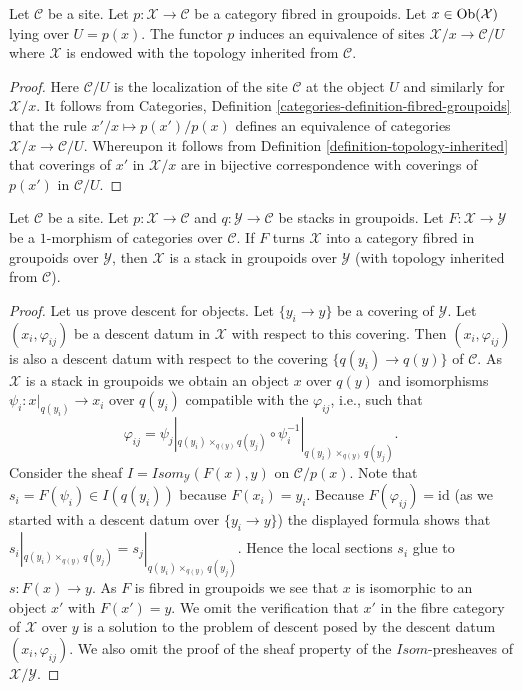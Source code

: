 \begin{lemma}
\label{lemma-localizing}
Let $\mathcal{C}$ be a site. Let $p : \mathcal{X} \to \mathcal{C}$
be a category fibred in groupoids. Let $x \in \mathop{\mathrm{Ob}}\nolimits(\mathcal{X})$
lying over $U = p(x)$. The functor $p$ induces an equivalence of sites
$\mathcal{X}/x \to \mathcal{C}/U$ where $\mathcal{X}$ is endowed with
the topology inherited from $\mathcal{C}$.
\end{lemma}

\begin{proof}
Here $\mathcal{C}/U$ is the localization of the site
$\mathcal{C}$ at the object $U$ and similarly for $\mathcal{X}/x$.
It follows from
Categories, Definition \ref{categories-definition-fibred-groupoids}
that the rule $x'/x \mapsto p(x')/p(x)$ defines an equivalence of
categories $\mathcal{X}/x \to \mathcal{C}/U$. Whereupon it follows from
Definition \ref{definition-topology-inherited}
that coverings of $x'$ in $\mathcal{X}/x$ are in bijective correspondence
with coverings of $p(x')$ in $\mathcal{C}/U$.
\end{proof}

\begin{lemma}
\label{lemma-stack-in-groupoids-over-stack-in-groupoids}
Let $\mathcal{C}$ be a site. Let $p : \mathcal{X} \to \mathcal{C}$
and $q : \mathcal{Y} \to \mathcal{C}$
be stacks in groupoids. Let $F : \mathcal{X} \to \mathcal{Y}$
be a $1$-morphism of categories over $\mathcal{C}$. If $F$ turns
$\mathcal{X}$ into a category fibred in groupoids over $\mathcal{Y}$,
then $\mathcal{X}$ is a stack in groupoids over $\mathcal{Y}$ (with
topology inherited from $\mathcal{C}$).
\end{lemma}

\begin{proof}
Let us prove descent for objects. Let $\{y_i \to y\}$ be a covering
of $\mathcal{Y}$. Let $(x_i, \varphi_{ij})$ be a descent datum in $\mathcal{X}$
with respect to this covering. Then $(x_i, \varphi_{ij})$ is also a descent
datum with respect to the covering $\{q(y_i) \to q(y)\}$ of
$\mathcal{C}$. As $\mathcal{X}$ is a stack in groupoids we obtain an
object $x$ over $q(y)$ and isomorphisms $\psi_i : x|_{q(y_i)} \to x_i$
over $q(y_i)$ compatible with the $\varphi_{ij}$, i.e., such that
$$
\varphi_{ij} = \psi_j|_{q(y_i) \times_{q(y)} q(y_j)}
\circ \psi_i^{-1}|_{q(y_i) \times_{q(y)} q(y_j)}.
$$
Consider the sheaf $\mathit{I} = \mathit{Isom}_\mathcal{Y}(F(x), y)$
on $\mathcal{C}/p(x)$. Note that $s_i = F(\psi_i) \in \mathit{I}(q(y_i))$
because $F(x_i) = y_i$. Because $F(\varphi_{ij}) = \text{id}$ (as we started
with a descent datum over $\{y_i \to y\}$) the displayed formula shows
that $s_i|_{q(y_i) \times_{q(y)} q(y_j)} = s_j|_{q(y_i) \times_{q(y)} q(y_j)}$.
Hence the local sections $s_i$ glue to $s : F(x) \to y$. As $F$ is fibred in
groupoids we see that $x$ is isomorphic to an object $x'$ with $F(x') = y$.
We omit the verification that $x'$ in the fibre category of $\mathcal{X}$
over $y$ is a solution to the problem of descent posed by the descent datum
$(x_i, \varphi_{ij})$. We also omit the proof of the sheaf property
of the $\mathit{Isom}$-presheaves of $\mathcal{X}/\mathcal{Y}$.
\end{proof}

